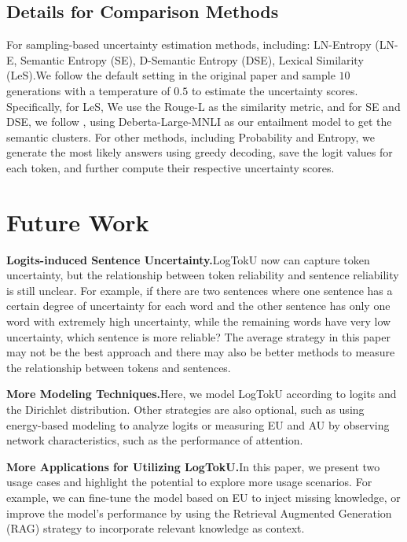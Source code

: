 \subsection{Details for Comparison Methods}
For sampling-based uncertainty estimation methods, including: LN-Entropy (LN-E, Semantic Entropy (SE), D-Semantic Entropy (DSE), Lexical Similarity (LeS).We follow the default setting in the original paper and sample $10$ generations with a temperature of $0.5$ to estimate the uncertainty scores. Specifically, for LeS, We use the Rouge-L as the similarity metric, and for SE and DSE, we follow \cite{farquhar2024detecting}, using Deberta-Large-MNLI as our entailment model to get the semantic clusters. For other methods, including Probability and Entropy, we generate the most likely answers using greedy decoding, save the logit values for each token, and further compute their respective uncertainty scores.



\section{Future Work}

\textbf{Logits-induced Sentence Uncertainty.}\quad LogTokU now can capture token uncertainty, but the relationship between token reliability and sentence reliability is still unclear. For example, if there are two sentences where one sentence has a certain degree of uncertainty for each word and the other sentence has only one word with extremely high uncertainty, while the remaining words have very low uncertainty, which sentence is more reliable? The average strategy in this paper may not be the best approach and there may also be better methods to measure the relationship between tokens and sentences.

\textbf{More Modeling Techniques.}\quad Here, we model LogTokU according to logits and the Dirichlet distribution. Other strategies are also optional, such as using energy-based modeling to analyze logits or measuring EU and AU by observing network characteristics, such as the performance of attention.

\textbf{More Applications for Utilizing LogTokU.}\quad In this paper, we present two usage cases and highlight the potential to explore more usage scenarios. For example, we can fine-tune the model based on EU to inject missing knowledge, or improve the model's performance by using the Retrieval Augmented Generation (RAG) strategy to incorporate relevant knowledge as context.

